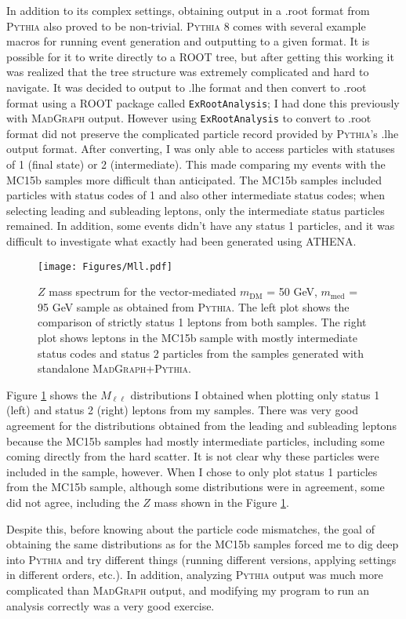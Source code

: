 In addition to its complex settings, obtaining output in a .root format from \textsc{Pythia} also proved to be non-trivial. \textsc{Pythia} 8 comes with several example macros for running event generation and outputting to a given format. It is possible for it to write directly to a ROOT tree, but after getting this working it was realized that the tree structure was extremely complicated and hard to navigate. It was decided to output to .lhe format and then convert to .root format using a ROOT package called \texttt{ExRootAnalysis}; I had done this previously with \textsc{MadGraph} output. However using \texttt{ExRootAnalysis} to convert to .root format did not preserve the complicated particle record provided by \textsc{Pythia}'s .lhe output format. After converting, I was only able to access particles with statuses of 1 (final state) or 2 (intermediate). This made comparing my events with the MC15b samples more difficult than anticipated. The MC15b samples included particles with status codes of 1 and also other intermediate status codes; when selecting leading and subleading leptons, only the intermediate status particles remained. In addition, some events didn't have any status 1 particles, and it was difficult to investigate what exactly had been generated using ATHENA.

\begin{figure}[h]
\centering
\texttt{[image: Figures/Mll.pdf]}
\caption[$Z$ mass spectrum for the vector-mediated $m_{\text{DM}}$ = 50 GeV, $m_{\text{med}}$ = 95 GeV sample as obtained from \textsc{Pythia}]{$Z$ mass spectrum for the vector-mediated $m_{\text{DM}}$ = 50 GeV, $m_{\text{med}}$ = 95 GeV sample as obtained from \textsc{Pythia}. The left plot shows the comparison of strictly status 1 leptons from both samples. The right plot shows leptons in the MC15b sample with mostly intermediate status codes and status 2 particles from the samples generated with standalone \textsc{MadGraph}+\textsc{Pythia}.}
\label{fig:Mll}
\end{figure}

\noindent Figure \ref{fig:Mll} shows the $M_{\ell\ell}$ distributions I obtained when plotting only status 1 (left) and status 2 (right) leptons from my samples. There was very good agreement for the distributions obtained from the leading and subleading leptons because the MC15b samples had mostly intermediate particles, including some coming directly from the hard scatter. It is not clear why these particles were included in the sample, however. When I chose to only plot status 1 particles from the MC15b sample, although some distributions were in agreement, some did not agree, including the $Z$ mass shown in the Figure \ref{fig:Mll}.

Despite this, before knowing about the particle code mismatches, the goal of obtaining the same distributions as for the MC15b samples forced me to dig deep into \textsc{Pythia} and try different things (running different versions, applying settings in different orders, etc.). In addition, analyzing \textsc{Pythia} output was much more complicated than \textsc{MadGraph} output, and modifying my program to run an analysis correctly was a very good exercise. 